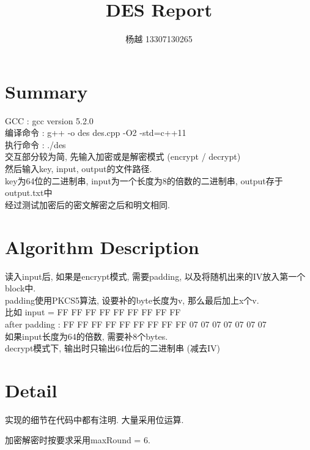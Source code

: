 \documentclass{article}
\title{DES Report}
\author{杨越 13307130265}
\begin{document}
\maketitle

\section{Summary}

GCC : gcc version 5.2.0\\

编译命令 : g++ -o des des.cpp -O2 -std=c++11\\
执行命令 : ./des\\

交互部分较为简, 先输入加密或是解密模式 (encrypt / decrypt)\\
然后输入key, input, output的文件路径.\\
key为64位的二进制串, input为一个长度为8的倍数的二进制串, output存于output.txt中\\

经过测试加密后的密文解密之后和明文相同.

\section{Algorithm Description}

读入input后, 如果是encrypt模式, 需要padding, 以及将随机出来的IV放入第一个block中. \\

padding使用PKCS5算法, 设要补的byte长度为v, 那么最后加上x个v.\\
比如 input =  FF FF FF FF FF FF FF FF FF\\
	after padding : FF FF FF FF FF FF FF FF FF 07 07 07 07 07 07 07\\

如果input长度为64的倍数, 需要补8个bytes.\\
decrypt模式下, 输出时只输出64位后的二进制串 (减去IV)\\


\section{Detail}

实现的细节在代码中都有注明. 大量采用位运算. 

加密解密时按要求采用maxRound = 6.
\end{document}
